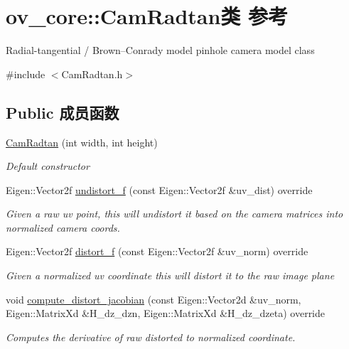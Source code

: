 \hypertarget{classov__core_1_1CamRadtan}{}\section{ov\+\_\+core\+:\+:Cam\+Radtan类 参考}
\label{classov__core_1_1CamRadtan}


Radial-\/tangential / Brown–\+Conrady model pinhole camera model class  




{\ttfamily \#include $<$Cam\+Radtan.\+h$>$}

\subsection*{Public 成员函数}
\begin{DoxyCompactItemize}
\item 
\hyperlink{classov__core_1_1CamRadtan_a34a91e335e1767f20e82cc6013a8ccc8}{Cam\+Radtan} (int width, int height)
\begin{DoxyCompactList}\small\item\em Default constructor \end{DoxyCompactList}\item 
Eigen\+::\+Vector2f \hyperlink{classov__core_1_1CamRadtan_af02fa84ed2fdc895aaaf216184aa25ef}{undistort\+\_\+f} (const Eigen\+::\+Vector2f \&uv\+\_\+dist) override
\begin{DoxyCompactList}\small\item\em Given a raw uv point, this will undistort it based on the camera matrices into normalized camera coords. \end{DoxyCompactList}\item 
Eigen\+::\+Vector2f \hyperlink{classov__core_1_1CamRadtan_a022376b5a15b827bbb7dabebc8df0508}{distort\+\_\+f} (const Eigen\+::\+Vector2f \&uv\+\_\+norm) override
\begin{DoxyCompactList}\small\item\em Given a normalized uv coordinate this will distort it to the raw image plane \end{DoxyCompactList}\item 
void \hyperlink{classov__core_1_1CamRadtan_a4ab5e54e89f48779a696f5b33d120dbc}{compute\+\_\+distort\+\_\+jacobian} (const Eigen\+::\+Vector2d \&uv\+\_\+norm, Eigen\+::\+Matrix\+Xd \&H\+\_\+dz\+\_\+dzn, Eigen\+::\+Matrix\+Xd \&H\+\_\+dz\+\_\+dzeta) override
\begin{DoxyCompactList}\small\item\em Computes the derivative of raw distorted to normalized coordinate. \end{DoxyCompactList}\end{DoxyCompactItemize}
